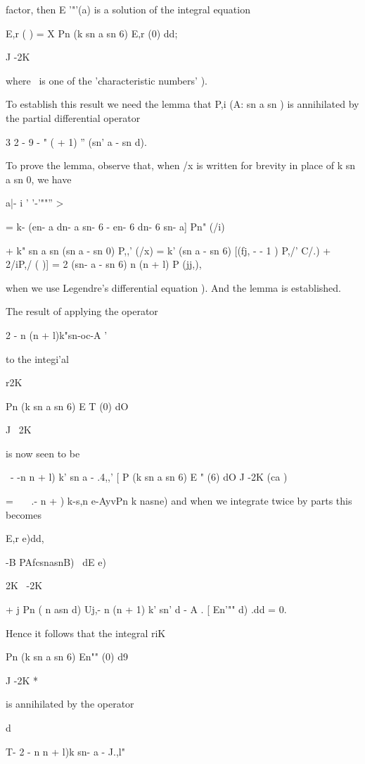 {{{{{{{%
%

factor, then E '"'(a) is a solution of the integral equation

E,r ( ) = X Pn (k sn a sn 6) E,r (0) dd;

J -2K

where \ is one of the 'characteristic numbers' ).

To establish this result we need the lemma that P,i (A: sn a sn ) is
annihilated by the partial differential operator

3 2 - 9 - " ( + 1) '' (sn' a - sn d).

To prove the lemma, observe that, when /x is written for brevity in
place of k sn a sn 0, we have

 a|- i ' '-'""'' >

= k- (en- a dn- a sn- 6 - en- 6 dn- 6 sn- a] Pn" (/i)

+ k" sn a sn (sn a - sn 0) P,,' (/x) = k' (sn a - sn 6) [(fj, - - 1 )
P,/' C/.) + 2/iP,/ ( )] = 2 (sn- a - sn 6) n (n + l) P (jj,),

when we use Legendre's differential equation ). And the lemma
is established.

The result of applying the operator

 2 - n (n + l)k"sn-oc-A '

to the integi'al

r2K

Pn (k sn a sn 6) E T (0) dO

J ~2K

is now seen to be

\ - -n n + l) k' sn a - .4,,' [ P (k sn a sn 6) E " (6) dO J -2K (ca
)

= \, \ \ .- n + ) k-s,n e-AyvPn k nasne) and when we integrate twice
by parts this becomes

E,r e)dd,

-B PAfcsnasnB) \ dE e)

2K \ -2K

+ j Pn ( n asn d) Uj,- n (n + 1) k' sn' d - A . [ En'"" d) .dd = 0.

Hence it follows that the integral riK

Pn (k sn a sn 6) En"" (0) d9

J -2K *

is annihilated by the operator

d

T- 2 - n n + l)k sn- a - J.,l"

%
%

}}}}}}}
